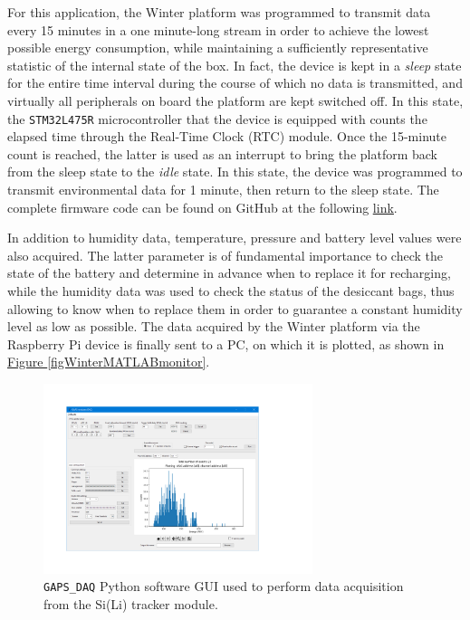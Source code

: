 \par
For this application, the Winter platform was programmed to transmit data every 15 minutes in a one minute-long stream in order to achieve the lowest possible energy consumption, while maintaining a sufficiently representative statistic of the internal state of the box. In fact, the device is kept in a \textit{sleep} state for the entire time interval during the course of which no data is transmitted, and virtually all peripherals on board the platform are kept switched off. In this state, the \texttt{STM32L475R} microcontroller that the device is equipped with counts the elapsed time through the Real-Time Clock (RTC) module. Once the 15-minute count is reached, the latter is used as an interrupt to bring the platform back from the sleep state to the \textit{idle} state. In this state, the device was programmed to transmit environmental data for 1 minute, then return to the sleep state. The complete firmware code can be found on GitHub at the following \href{https://github.com/lucaghislo/winterGAPS/tree/main}{\underline{link}}.

\par
In addition to humidity data, temperature, pressure and battery level values were also acquired. The latter parameter is of fundamental importance to check the state of the battery and determine in advance when to replace it for recharging, while the humidity data was used to check the status of the desiccant bags, thus allowing to know when to replace them in order to guarantee a constant humidity level as low as possible. The data acquired by the Winter platform via the Raspberry Pi device is finally sent to a PC, on which it is plotted, as shown in \hyperref[figWinterMATLABmonitor]{Figure \ref{figWinterMATLABmonitor}}.

\begin{figure}[h!]
    \centering
    \includegraphics[width=0.7\textwidth]{Images/chap3/GAPS_DAQ.pdf}
    \caption{\texttt{GAPS\_DAQ} Python software GUI used to perform data acquisition from the Si(Li) tracker module.}
    \label{figGapsDAQpy}
\end{figure}

